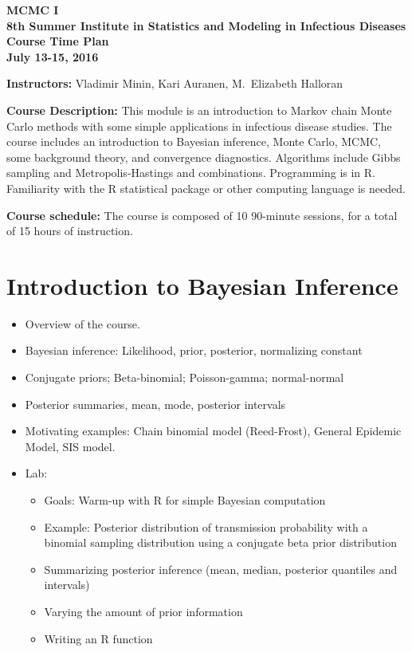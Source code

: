 \documentclass[11pt]{article}
\begin{document}

\addtolength{\baselineskip}{0.0\baselineskip}  
\pagestyle{myheadings} 

\begin{center}
{\bf  MCMC I \\
8th Summer Institute in Statistics and Modeling in Infectious Diseases \\
 Course Time Plan  \\
July 13-15, 2016}  
\end{center}

\vspace{.2cm}

\noindent
 {\bf Instructors:} Vladimir Minin,  Kari Auranen, M.\ Elizabeth Halloran\\

\vspace{.3cm}

\noindent
{\bf Course Description:} This module is an introduction to Markov chain Monte Carlo methods with some simple applications in infectious disease 
studies.  
 The course includes an introduction to 
 Bayesian inference, Monte Carlo, MCMC, some background theory, and convergence diagnostics. Algorithms include Gibbs sampling and Metropolis-Hastings and combinations. Programming is in R. 
 Familiarity with the R statistical package or other computing language is needed. 



\noindent
{\bf Course schedule:}
The course is composed of 10 90-minute sessions, for a total of 15 hours of instruction. 


\section{Introduction to Bayesian Inference} 
\begin{itemize} 
\item Overview of the course. 
\item Bayesian inference: Likelihood, prior, posterior, normalizing constant  
\item Conjugate priors; Beta-binomial; Poisson-gamma; normal-normal 
\item Posterior summaries, mean, mode,  posterior intervals   
\item Motivating examples: Chain binomial model (Reed-Frost), General Epidemic Model,  
SIS model.
\item {Lab: }
\begin{itemize}
\item Goals:  Warm-up with R for simple Bayesian computation
\item  Example: Posterior distribution of transmission probability with a binomial  sampling distribution using a conjugate beta prior distribution
\item Summarizing posterior inference (mean, median, posterior quantiles and intervals)
\item Varying the amount of prior information
\item Writing an R function
\end{itemize}
\end{itemize}
\end{document}
